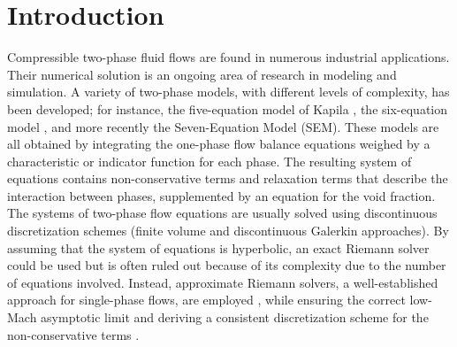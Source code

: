 \documentclass[preprint,10pt]{elsarticle}
\begin{document}
\section{Introduction}\label{sec:intro}
%
Compressible two-phase fluid flows are found in numerous industrial applications. Their numerical solution is an ongoing area of research in modeling and simulation. A variety of two-phase models, with different levels of complexity, has been developed; for instance, the five-equation model of Kapila \cite{Kapila_2001}, the six-equation model \cite{Toumi_1996}, and more recently the Seven-Equation Model  (SEM)\cite{SEM}. These models are all obtained by integrating the one-phase flow balance equations weighed by a characteristic or indicator function for each phase. The resulting system of equations contains non-conservative terms and relaxation terms that describe the interaction between phases, supplemented by an equation for the void fraction. 
The systems of two-phase flow equations are usually solved using discontinuous discretization schemes (finite volume and discontinuous Galerkin approaches). By assuming that the system of equations is hyperbolic, an exact Riemann solver could be used but is often ruled out because of its complexity due to the number of equations involved. Instead, approximate Riemann solvers, a well-established approach for single-phase flows, are employed \cite{Saurel_2001a, Saurel_2001b, Li_2004, Zein_2010, Ambroso_2012},  while ensuring the correct low-Mach asymptotic limit and deriving a consistent discretization scheme for the non-conservative terms \cite{Li_2004, Abgrall_2002}.
%
\end{document}
